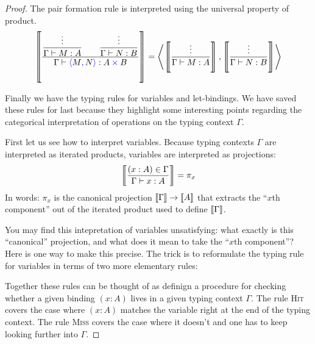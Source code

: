 \begin{proof}
  The pair formation rule is interpreted using the universal property of product.
  \begin{align}
    \llbr{
      \displaystyle\frac
        {\displaystyle\frac{\vdots}{{{{\Gamma \vdash M : A}}}}
          \qquad
         \displaystyle\frac{\vdots}{{{{\Gamma \vdash N : B}}}}
        }
        {\Gamma \vdash \plpair{M}{N} : A \pltimes B}
    }
    = \left\langle
      \llbr{\frac{\vdots}{\Gamma \vdash M: A}}
      ,
      \llbr{\frac{\vdots}{\Gamma \vdash N: B}}
    \right\rangle
  \end{align}

  Finally we have the typing rules for variables and let-bindings.
  We have saved these rules for last because they highlight some
  interesting points regarding the categorical interpretation
  of operations on the typing context \(\Gamma\).

  First let us see how to interpret variables.
  Because typing contexts \(\Gamma\) are interpreted as iterated products,
  variables are interpreted as projections:
  \begin{align}
    \left\llbracket 
      \frac{(x:A)\in\Gamma}{\Gamma \vdash x : A}
    \right\rrbracket
    = \pi_x
  \end{align}
  In words: \(\pi_x\) is the canonical projection
  \(\left\llbracket \Gamma\right\rrbracket \to \left\llbracket A\right\rrbracket\)
  that extracts the
  ``\(x\)th component'' out of
  the iterated product used to define \(\left\llbracket \Gamma\right\rrbracket\).

  You may find this intepretation of variables unsatisfying:
  what exactly is this ``canonical'' projection,
  and what does it mean to take the ``\(x\)th component''?
  Here is one way to make this precise.
  The trick is to reformulate the typing rule for variables
  in terms of two more elementary rules:
  Together these rules can be thought of as definign
  a procedure for checking whether a given binding \((x:A)\)
  lives in a given typing context \(\Gamma\).
  The rule \textsc{Hit} covers the case where \((x:A)\)
  matches the variable right at the end of the typing context.
  The rule \textsc{Miss} covers the case where
  it doesn't and one has to keep looking further into \(\Gamma\).


\end{proof}
